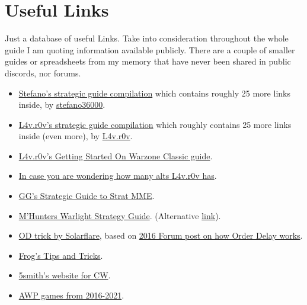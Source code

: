 \section{Useful Links} \label{Useful Links}
\small
Just a database of useful Links. Take into consideration throughout the whole guide I am quoting information available publicly. There are a couple of smaller guides or spreadsheets from my memory that have never been shared in public discords, nor forums. 
\begin{itemize}
    \item \href{https://www.warzone.com/Forum/688994-strategy-guides}{Stefano's strategic guide compilation} which contains roughly 25 more links inside, by \href{https://www.warzone.com/Profile?p=35118422654&u=stefano36000_1}{stefano36000}.
    \item  \href{https://www.warzone.com/Forum/168132-strat-guides}{L4v.r0v's strategic guide compilation} which roughly contains 25 more links inside (even more), by \href{https://www.warzone.com/Profile?p=3022124041&u=l4v.r0v_1}{L4v.r0v}.
    \item \href{https://docs.google.com/document/d/e/2PACX-1vS5eO54w3LgnkcwbLqM3DhynuQGoChrPn313QXIMm0QZ3ApILPuvcunEdmG_nZflHKcfRwCpZfvHA8L/pub}{L4v.r0v's Getting Started On Warzone Classic guide}.
    \item \href{https://www.warzone.com/Forum/531949-2021-check-up-old-warlight-update?Offset=13}{In case you are wondering how many alts L4v.r0v has}.
    \item \href{https://drive.google.com/file/d/1gknwZspOogXewj54tGUK7DjXcJx8srQn/view?usp=sharing}{GG's Strategic Guide to Strat MME}.
    \item \href{http://nghood.com/pages/warzone/strategyguide}{M'Hunters Warlight Strategy Guide}. (Alternative \href{https://warlight.nghood.com/index.html}{link}).
    \item \href{https://www.warzone.com/Forum/694458-new-trick-solarflare}{OD trick by Solarflare}, based on \href{https://www.warzone.com/Forum/152388-move-order?Offset=0}{2016 Forum post on how Order Delay works}.
    \item \href{https://www.warzone.com/Forum/149405-trans-attc-percentage-cards?Offset=0}{Frog's Tips and Tricks}.
    \item \href{https://wz-cw.5smith.ru/}{5smith's website for CW}.
    \item \href{https://docs.google.com/spreadsheets/d/e/2PACX-1vSdxy4qj1eyR5bgaFELmFX73EGkRVypdzzOsLXIHpFR8K1pMcz2G26iz_JFwxPgK2t_4TEOoDAD0uEp/pub?gid=648212339}{AWP games from 2016-2021}.

\end{itemize}
